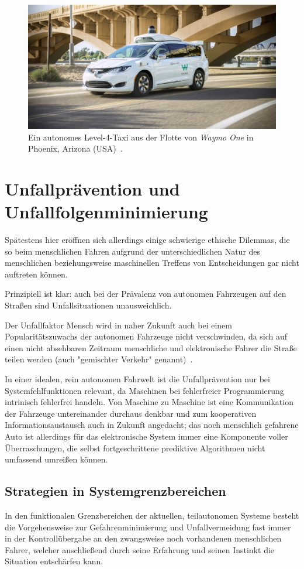 \documentclass[twocolumn, german]{tum-article}
\begin{document}
\begin{figure}
	\includegraphics[width=\linewidth]{media/waymo-one.jpg}
	\caption{Ein autonomes Level-4-Taxi aus der Flotte von \emph{Waymo One} in Phoenix, Arizona (USA)~\cite{waymo-img}.}
\end{figure}


\section{Unfallprävention und Unfallfolgenminimierung}
Spätestens hier eröffnen sich allerdings einige schwierige ethische Dilemmas, die so beim menschlichen Fahren aufgrund der unterschiedlichen Natur des menschlichen beziehungsweise maschinellen Treffens von Entscheidungen gar nicht auftreten können.

Prinzipiell ist klar: auch bei der Prävalenz von autonomen Fahrzeugen auf den Straßen sind Unfallsituationen unausweichlich.

Der Unfallfaktor Mensch wird in naher Zukunft auch bei einem Popularitätszuwachs der autonomen Fahrzeuge nicht verschwinden, da sich auf einen nicht absehbaren Zeitraum menschliche und elektronische Fahrer die Straße teilen werden (auch "gemischter Verkehr" genannt)~\cite[S. 1278]{nyholm-ethics}.

In einer idealen, rein autonomen Fahrwelt ist die Unfallprävention nur bei Systemfehlfunktionen relevant, da Maschinen bei fehlerfreier Programmierung intrinisch fehlerfrei handeln.
Von Maschine zu Maschine ist eine Kommunikation der Fahrzeuge untereinander durchaus denkbar und zum kooperativen Informationsaustausch auch in Zukunft angedacht; das noch menschlich gefahrene Auto ist allerdings für das elektronische System immer eine Komponente voller Überraschungen, die selbst fortgeschrittene prediktive Algorithmen nicht umfassend umreißen können.


\subsection{Strategien in Systemgrenzbereichen}
In den funktionalen Grenzbereichen der aktuellen, teilautonomen Systeme besteht die Vorgehensweise zur Gefahrenminimierung und Unfallvermeidung fast immer in der Kontrollübergabe an den zwangsweise noch vorhandenen menschlichen Fahrer, welcher anschließend durch seine Erfahrung und seinen Instinkt die Situation entschärfen kann.
\end{document}
